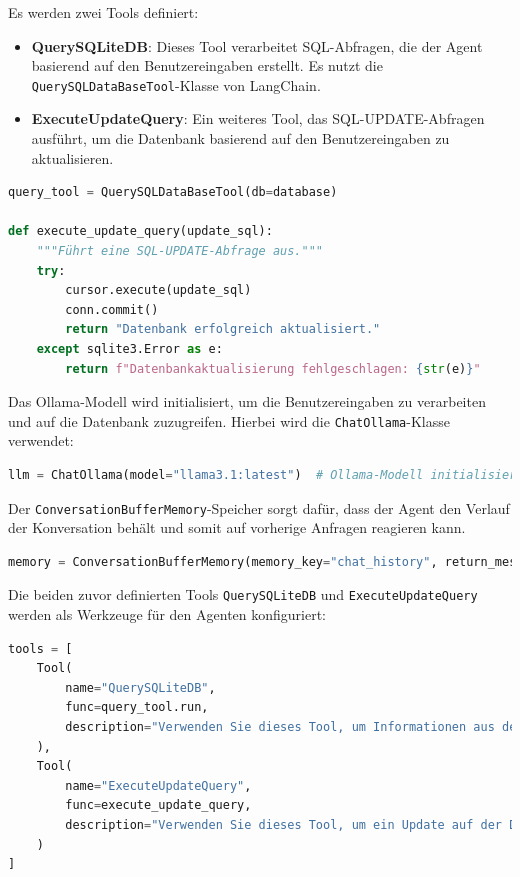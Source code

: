 Es werden zwei Tools definiert:
\begin{itemize}
    \item \textbf{QuerySQLiteDB}: Dieses Tool verarbeitet SQL-Abfragen, die der Agent basierend auf den Benutzereingaben erstellt. Es nutzt die \texttt{QuerySQLDataBaseTool}-Klasse von LangChain.
    \item \textbf{ExecuteUpdateQuery}: Ein weiteres Tool, das SQL-UPDATE-Abfragen ausführt, um die Datenbank basierend auf den Benutzereingaben zu aktualisieren.
\end{itemize}

\begin{lstlisting}[language=Python]
query_tool = QuerySQLDataBaseTool(db=database)

def execute_update_query(update_sql):
    """Führt eine SQL-UPDATE-Abfrage aus."""
    try:
        cursor.execute(update_sql)
        conn.commit()
        return "Datenbank erfolgreich aktualisiert."
    except sqlite3.Error as e:
        return f"Datenbankaktualisierung fehlgeschlagen: {str(e)}"
\end{lstlisting}

Das Ollama-Modell wird initialisiert, um die Benutzereingaben zu verarbeiten und auf die Datenbank zuzugreifen. Hierbei wird die \texttt{ChatOllama}-Klasse verwendet:

\begin{lstlisting}[language=Python]
llm = ChatOllama(model="llama3.1:latest")  # Ollama-Modell initialisieren
\end{lstlisting}

Der \texttt{ConversationBufferMemory}-Speicher sorgt dafür, dass der Agent den Verlauf der Konversation behält und somit auf vorherige Anfragen reagieren kann.

\begin{lstlisting}[language=Python]
memory = ConversationBufferMemory(memory_key="chat_history", return_messages=True)
\end{lstlisting}

Die beiden zuvor definierten Tools \texttt{QuerySQLiteDB} und \texttt{ExecuteUpdateQuery} werden als Werkzeuge für den Agenten konfiguriert:

\begin{lstlisting}[language=Python]
tools = [
    Tool(
        name="QuerySQLiteDB",
        func=query_tool.run,
        description="Verwenden Sie dieses Tool, um Informationen aus der SQLite-Datenbank abzurufen."
    ),
    Tool(
        name="ExecuteUpdateQuery",
        func=execute_update_query,
        description="Verwenden Sie dieses Tool, um ein Update auf der Datenbank auszuführen."
    )
]
\end{lstlisting}

